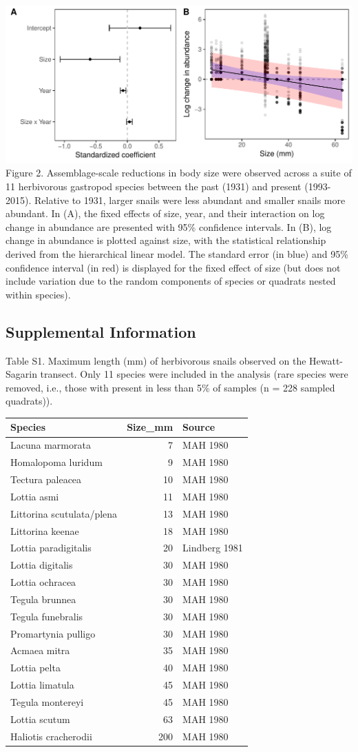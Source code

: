 \documentclass[11pt,]{article}
\begin{document}
\includegraphics[width=1.00000\textwidth]{../../figs_ms/lrr_herb_size_glmm_2panel.pdf}
Figure 2. Assemblage-scale reductions in body size were observed across
a suite of 11 herbivorous gastropod species between the past (1931) and
present (1993-2015). Relative to 1931, larger snails were less abundant
and smaller snails more abundant. In (A), the fixed effects of size,
year, and their interaction on log change in abundance are presented
with 95\% confidence intervals. In (B), log change in abundance is
plotted against size, with the statistical relationship derived from the
hierarchical linear model. The standard error (in blue) and 95\%
confidence interval (in red) is displayed for the fixed effect of size
(but does not include variation due to the random components of species
or quadrats nested within species).

\newpage 

\subsection{Supplemental Information}\label{supplemental-information}

Table S1. Maximum length (mm) of herbivorous snails observed on the
Hewatt-Sagarin transect. Only 11 species were included in the analysis
(rare species were removed, i.e., those with present in less than 5\% of
samples (n = 228 sampled quadrats)).

\begin{longtable}[]{@{}lrl@{}}
\toprule
Species & Size\_mm & Source\tabularnewline
\midrule
\endhead
Lacuna marmorata & 7 & MAH 1980\tabularnewline
Homalopoma luridum & 9 & MAH 1980\tabularnewline
Tectura paleacea & 10 & MAH 1980\tabularnewline
Lottia asmi & 11 & MAH 1980\tabularnewline
Littorina scutulata/plena & 13 & MAH 1980\tabularnewline
Littorina keenae & 18 & MAH 1980\tabularnewline
Lottia paradigitalis & 20 & Lindberg 1981\tabularnewline
Lottia digitalis & 30 & MAH 1980\tabularnewline
Lottia ochracea & 30 & MAH 1980\tabularnewline
Tegula brunnea & 30 & MAH 1980\tabularnewline
Tegula funebralis & 30 & MAH 1980\tabularnewline
Promartynia pulligo & 30 & MAH 1980\tabularnewline
Acmaea mitra & 35 & MAH 1980\tabularnewline
Lottia pelta & 40 & MAH 1980\tabularnewline
Lottia limatula & 45 & MAH 1980\tabularnewline
Tegula montereyi & 45 & MAH 1980\tabularnewline
Lottia scutum & 63 & MAH 1980\tabularnewline
Haliotis cracherodii & 200 & MAH 1980\tabularnewline
\bottomrule
\end{longtable}
\end{document}
